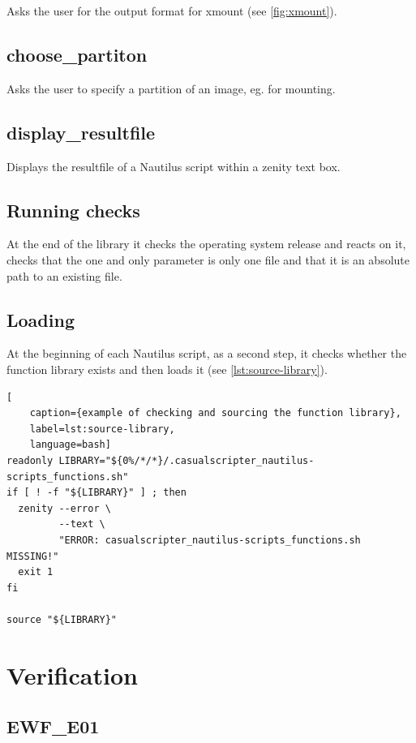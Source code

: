 Asks the user for the output format for xmount (see \cref{fig:xmount}).

\subsection{choose\_partiton}

Asks the user to specify a partition of an image, eg. for mounting.

\subsection{display\_resultfile}

Displays the resultfile of a Nautilus script within a zenity text box.

\subsection{Running checks}

At the end of the library it checks the operating system release and reacts on it, checks that the one and only parameter is only one file and that it is an absolute path to an existing file.

\subsection{Loading}

At the beginning of each Nautilus script, as a second step, it checks whether the function library exists and then loads it (see \cref{lst:source-library}).

\begin{lstlisting}[
    caption={example of checking and sourcing the function library},
    label=lst:source-library,
    language=bash]
readonly LIBRARY="${0%/*/*}/.casualscripter_nautilus-scripts_functions.sh"
if [ ! -f "${LIBRARY}" ] ; then
  zenity --error \
         --text \
         "ERROR: casualscripter_nautilus-scripts_functions.sh MISSING!"
  exit 1
fi

source "${LIBRARY}"
\end{lstlisting}

\section{Verification}

\subsection{EWF\_E01}

